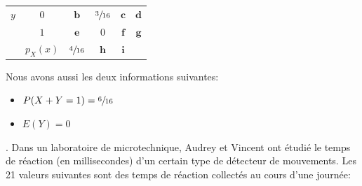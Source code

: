 \begin{questions}
\begin{center}
{\begin{tabular}{cc|ccc|c}
 $y$        & $0$   &     $\boldsymbol{b}$          &$\sfrac{3}{16}$   &  $\boldsymbol{c}$& $\boldsymbol{d}$\\
            & $1$   &       $\boldsymbol{e}$        &  $0$& $\boldsymbol{f}$ & $\boldsymbol{g}$\\
\hline
&$p_X(x)$   & $\sfrac{4}{16}$  &$\boldsymbol{h}$ &$\boldsymbol{i}$& \\
\end{tabular}
}
 \end{center}

    
Nous avons aussi les deux informations suivantes:
\begin{itemize}
    \item $P(X+Y=1)=\displaystyle \sfrac{6}{16}$
    \item $E(Y)=0$
\end{itemize}

\vspace{0.5cm}

\newpage . \newpage
\question[]\label{micro}
Dans un laboratoire de microtechnique, Audrey et Vincent ont étudié le temps de réaction (en millisecondes) d'un certain type de détecteur de mouvements. Les 21 valeurs suivantes sont des temps de réaction collectés au cours d'une journée:


\end{questions}
